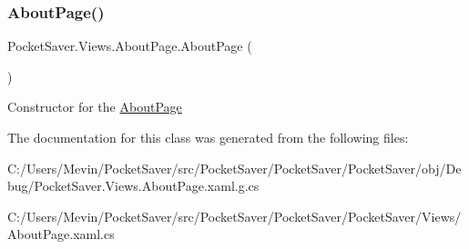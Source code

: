 \subsubsection{\texorpdfstring{About\+Page()}{AboutPage()}}
{\footnotesize\ttfamily Pocket\+Saver.\+Views.\+About\+Page.\+About\+Page (\begin{DoxyParamCaption}{ }\end{DoxyParamCaption})\hspace{0.3cm}{\ttfamily [inline]}}



Constructor for the \hyperlink{class_pocket_saver_1_1_views_1_1_about_page}{About\+Page} 



The documentation for this class was generated from the following files\+:\begin{DoxyCompactItemize}
\item 
C\+:/\+Users/\+Mevin/\+Pocket\+Saver/src/\+Pocket\+Saver/\+Pocket\+Saver/\+Pocket\+Saver/obj/\+Debug/Pocket\+Saver.\+Views.\+About\+Page.\+xaml.\+g.\+cs\item 
C\+:/\+Users/\+Mevin/\+Pocket\+Saver/src/\+Pocket\+Saver/\+Pocket\+Saver/\+Pocket\+Saver/\+Views/About\+Page.\+xaml.\+cs\end{DoxyCompactItemize}
